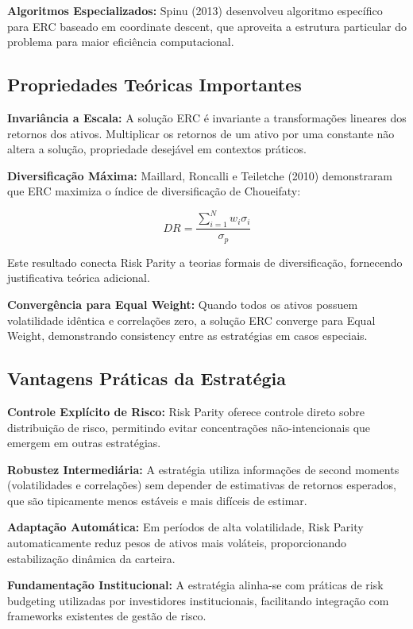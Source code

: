\textbf{Algoritmos Especializados:} Spinu (2013) desenvolveu algoritmo específico para ERC baseado em coordinate descent, que aproveita a estrutura particular do problema para maior eficiência computacional.

\subsection{Propriedades Teóricas Importantes}

\textbf{Invariância a Escala:} A solução ERC é invariante a transformações lineares dos retornos dos ativos. Multiplicar os retornos de um ativo por uma constante não altera a solução, propriedade desejável em contextos práticos.

\textbf{Diversificação Máxima:} Maillard, Roncalli e Teiletche (2010) demonstraram que ERC maximiza o índice de diversificação de Choueifaty:

\begin{equation}
DR = \frac{\sum_{i=1}^{N} w_i \sigma_i}{\sigma_p}
\end{equation}

Este resultado conecta Risk Parity a teorias formais de diversificação, fornecendo justificativa teórica adicional.

\textbf{Convergência para Equal Weight:} Quando todos os ativos possuem volatilidade idêntica e correlações zero, a solução ERC converge para Equal Weight, demonstrando consistency entre as estratégias em casos especiais.

\subsection{Vantagens Práticas da Estratégia}

\textbf{Controle Explícito de Risco:} Risk Parity oferece controle direto sobre distribuição de risco, permitindo evitar concentrações não-intencionais que emergem em outras estratégias.

\textbf{Robustez Intermediária:} A estratégia utiliza informações de second moments (volatilidades e correlações) sem depender de estimativas de retornos esperados, que são tipicamente menos estáveis e mais difíceis de estimar.

\textbf{Adaptação Automática:} Em períodos de alta volatilidade, Risk Parity automaticamente reduz pesos de ativos mais voláteis, proporcionando estabilização dinâmica da carteira.

\textbf{Fundamentação Institucional:} A estratégia alinha-se com práticas de risk budgeting utilizadas por investidores institucionais, facilitando integração com frameworks existentes de gestão de risco.

